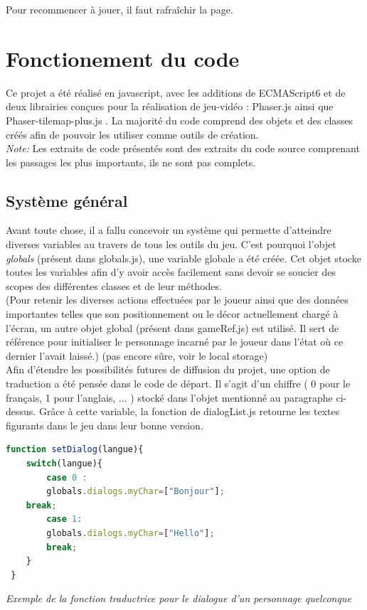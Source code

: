 \documentclass[11pt]{article}
\begin{document}
Pour recommencer à jouer, il faut rafraîchir la page.



\section{Fonctionement du code}
Ce projet a été réalisé en javascript, avec les additions de ECMAScript6 et de deux librairies conçues pour la réalisation de jeu-vidéo : Phaser.js ainsi que Phaser-tilemap-plus.js . La majorité du code comprend des objets et des classes créés afin de pouvoir les utiliser comme outils de création.\\

\textit{Note:} Les extraits de code présentés sont des extraits du code source comprenant les passages les plus importants, ils ne sont pas complets.

\subsection{Système général}
	Avant toute chose, il a fallu concevoir un système qui permette d'atteindre diverses variables au travers de tous les outils du jeu. C'est pourquoi l'objet \textit{globals} (présent dans globals.js), une variable globale a été créée. Cet objet stocke toutes les variables afin d'y avoir accès facilement sans devoir se soucier des scopes des différentes classes et de leur méthodes.\\
	
	
	(Pour retenir les diverses actions effectuées par le joueur ainsi que des données importantes telles que son positionnement ou le décor actuellement chargé à l'écran, un autre objet global (présent dans gameRef.js) est utilisé. Il sert de référence pour initialiser le personnage incarné par le joueur dans l'état où ce dernier l'avait laissé.) (pas encore sûre, voir le local storage)\\
 
 Afin d'étendre les possibilités futures de diffusion du projet, une option de traduction a été pensée dans le code de départ. Il s'agit d'un chiffre ( 0 pour le français, 1 pour l'anglais, ... ) stocké dans l'objet mentionné au paragraphe ci-dessus. Grâce à cette variable, la fonction de dialogList.js retourne les textes figurants dans le jeu dans leur bonne version. \\
 \begin{lstlisting}[language=JavaScript]
 function setDialog(langue){
    switch(langue){
        case 0 : 
        globals.dialogs.myChar=["Bonjour"];
    break;
        case 1:
        globals.dialogs.myChar=["Hello"];
		break;
 	}
 }
\end{lstlisting}
\textit{Exemple de la fonction traductrice pour le dialogue d'un personnage quelconque}
\end{document}
